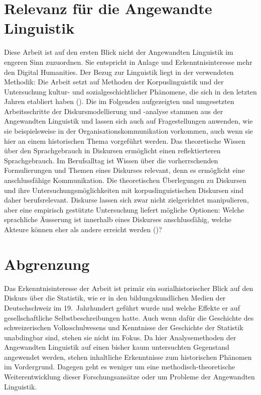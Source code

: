 \section{Relevanz für die Angewandte Linguistik}

Diese Arbeit ist auf den ersten Blick nicht der Angewandten Linguistik im engeren Sinn zuzuordnen. Sie entspricht in Anlage und Erkenntnisinteresse mehr den Digital Humanities. Der Bezug zur Linguistik liegt in der verwendeten Methodik: Die Arbeit setzt auf Methoden der Korpuslinguistik und der Untersuchung kultur- und sozialgeschichtlicher Phänomene, die sich in den letzten Jahren etabliert haben (\cite{bubenhofer_sprachgebrauchsmuster_2009}). Die im Folgenden aufgezeigten und umgesetzten Arbeitsschritte der Diskursmodellierung und -analyse stammen aus der Angewandten Linguistik und lassen sich auch auf Fragestellungen anwenden, wie sie beispielsweise in der Organisationskommunikation vorkommen, auch wenn sie hier an einem historischen Thema vorgeführt werden. Das theoretische Wissen über den Sprachgebrauch in Diskursen ermöglicht einen reflektierteren Sprachgebrauch. Im Berufsalltag ist Wissen über die vorherrschenden Formulierungen und Themen eines Diskurses relevant, denn es ermöglicht eine anschlussfähige Kommunikation. Die theoretischen Überlegungen zu Diskursen und ihre Untersuchungsmöglichkeiten mit korpuslinguistischen Diskursen sind daher berufsrelevant. Diskurse lassen sich zwar nicht zielgerichtet manipulieren, aber eine empirisch gestützte Untersuchung liefert mögliche Optionen: Welche sprachliche Äusserung ist innerhalb eines Diskurses anschlussfähig, welche Akteure können eher als andere erreicht werden (\cite{dreesen_diskurslinguistik_2019})?

\section{Abgrenzung}

Das Erkenntnisinteresse der Arbeit ist primär ein sozialhistorischer Blick auf den Diskurs über die Statistik, wie er in den bildungskundlichen Medien der Deutschschweiz im 19.~Jahrhundert geführt wurde und welche Effekte er auf gesellschaftliche Selbstbeschreibungen hatte. Auch wenn dafür die Geschichte des schweizerischen Volksschulwesens und Kenntnisse der Geschichte der Statistik unabdingbar sind, stehen sie nicht im Fokus. Da hier Analysemethoden der Angewandten Linguistik auf einen bisher kaum untersuchten Gegenstand angewendet werden, stehen inhaltliche Erkenntnisse zum historischen Phänomen im Vordergrund. Dagegen geht es weniger um eine methodisch-theoretische Weiterentwicklung dieser Forschungsansätze oder um Probleme der Angewandten Linguistik.

